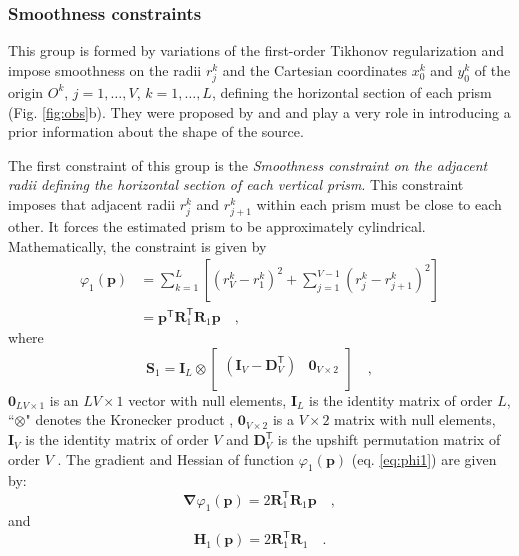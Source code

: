 \subsubsection{Smoothness constraints}

This group is formed by variations of the first-order Tikhonov regularization \citep[][ p. 103]{aster-etal2019}
and impose smoothness on the radii $r_{j}^{k}$ and the Cartesian coordinates $x_{0}^{k}$ and $y_{0}^{k}$ of the origin 
$O^{k}$, $j = 1, \dots, V$, $k = 1, \dots, L$, defining the horizontal section of each prism (Fig. \ref{fig:obs}b).
They were proposed by \cite{oliveirajr-etal2011} and \cite{oliveirajr-barbosa2013} and play a very 
role in introducing a prior information about the shape of the source. 

The first constraint of this group is the \textit{Smoothness constraint on the adjacent radii defining the horizontal 
section of each vertical prism}. This constraint imposes that adjacent radii $r_{j}^{k}$ and $r_{j+1}^{k}$ within each 
prism must be close to each other. It forces the estimated prism to be approximately cylindrical. Mathematically, the constraint is given by
\begin{equation}\label{eq:phi1}
\begin{split}
\varphi_{1}(\mathbf{p}) &= \sum\limits^{L}_{k=1}\left[\left(r^{k}_{V}-r^{k}_{1}\right)^2 + \sum\limits^{V-1}_{j=1}\left(r^{k}_{j}-r^{k}_{j+1}\right)^2\right]\\
 &= \mathbf{p}^{\mathsf{T}} \mathbf{R}^{\mathsf{T}}_{1}\mathbf{R}_{1} \mathbf{p} \quad ,
\end{split}
\end{equation}
where
\begin{equation}
\mathbf{S}_{1} = 
\mathbf{I}_{L} \otimes 
\begin{bmatrix}
\left( \mathbf{I}_{V} - \mathbf{D}_{V}^\mathsf{T} \right) & \mathbf{0}_{V \times 2} \\
\end{bmatrix} \quad ,
\label{eq:S1-matrix}
\end{equation}
$\mathbf{0}_{LV \times 1}$ is an $LV \times 1$ vector with null elements, 
$\mathbf{I}_{L}$ is the identity matrix of order $L$, ``$\otimes$" denotes the Kronecker product 
\citep[][ p. 243]{horn_johnson1991}, $\mathbf{0}_{V \times 2}$ is a $V \times 2$ matrix with null elements, 
$\mathbf{I}_{V}$ is the identity matrix of order $V$ and $\mathbf{D}_{V}^\mathsf{T}$ is the upshift permutation 
matrix of order $V$ \citep[][ p. 20]{golub-vanloan2013}. The gradient and Hessian of function $\varphi_{1}(\mathbf{p})$ (eq. \ref{eq:phi1}) are given by:
\begin{equation}\label{eq:phi1_grad}
\boldsymbol{\nabla}\varphi_{1}(\mathbf{p}) = 2 \mathbf{R}^\mathsf{T}_{1}\mathbf{R}_{1}\mathbf{p} \quad ,
\end{equation}
and
\begin{equation}\label{eq:phi1_hessian}
\mathbf{H}_{1}(\mathbf{p}) = 2\mathbf{R}^\mathsf{T}_{1}\mathbf{R}_{1} \quad .
\end{equation}

